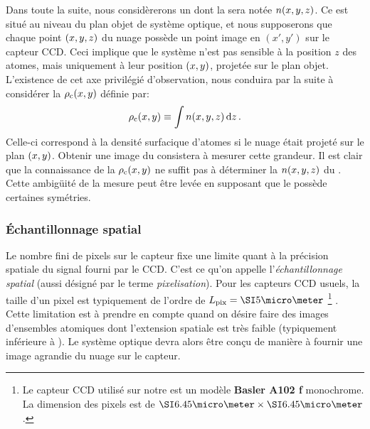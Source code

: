 {\AjouteLigne}

Dans toute la suite, nous considèrerons un \nat dont la \dat sera notée ${{n}(x,y,z)}$. Ce \n est situé au niveau du plan objet de système optique, et nous supposerons que chaque point $(x,y,z)$ du nuage possède un point image en $(x',y')$ sur le capteur CCD. 
Ceci implique que le système n'est pas sensible à la position $z$ des atomes, mais uniquement à leur position $(x,y)$, projetée sur le plan objet.%
%
\Resultat
{
L'existence de cet axe privilégié d'observation, nous conduira par la suite à considérer la \emph{\dcol} ${{{\rho_{\rm{c}}}}(x,y)}$ définie par:%
\begin{equation}
	\denscolxy \equiv \Integrale{\densxyz}{\dz}
	\pointformule
	\label{eq:denscol}
\end{equation}
Celle-ci correspond à la densité surfacique d'atomes si le nuage était projeté sur le plan $(x,y)$. Obtenir une image du \n consistera à mesurer cette grandeur.
}
Il est clair que la connaissance de la \dcol ${{{\rho_{\rm{c}}}}(x,y)}$ ne suffit pas à déterminer la \dat ${{n}(x,y,z)}$ du \n. Cette ambigüité de la mesure peut être levée en supposant que le \n possède certaines symétries.

\subsubsection{Échantillonnage spatial}
	Le nombre fini de pixels sur le capteur fixe une limite quant à la précision spatiale du signal fourni par le CCD. C'est ce qu'on appelle l'\emph{échantillonnage spatial} (aussi désigné par le terme \emph{pixelisation}). Pour les capteurs CCD usuels, la taille d'un pixel est typiquement de l'ordre de $\Lpix=\micron{5}$%
\footnote{Le capteur CCD utilisé sur notre \setup est un modèle \textbf{Basler A102 f} monochrome. La dimension des pixels est de $\micron{6.45} \times \micron{6.45}$. 
}%
. Cette limitation est à prendre en compte quand on désire faire des images d'ensembles atomiques dont l'extension spatiale est très faible (typiquement inférieure à ). Le système optique devra alors être conçu de manière à fournir une image agrandie du nuage sur le capteur. 
	
